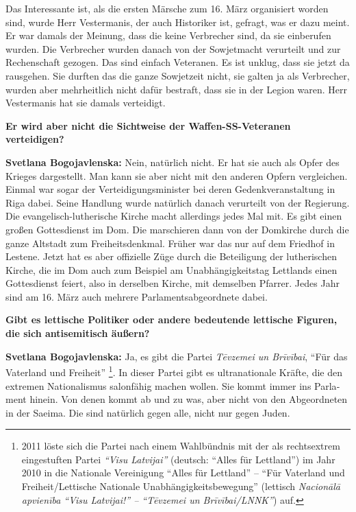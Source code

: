 \begin{otherlanguage}{ngerman}
Das Interessante ist, als die ersten Märsche zum 16. März organisiert worden sind, wurde Herr Vestermanis, der auch Historiker ist, gefragt, was er dazu meint. Er war damals der Meinung, dass die keine Verbrecher sind, da sie einberufen wurden. Die Verbrecher wurden danach von der Sowjetmacht verurteilt und zur Rechenschaft gezogen. Das sind einfach Veteranen. Es ist unklug, dass sie jetzt da rausgehen. Sie durften das die ganze Sowjetzeit nicht, sie galten ja als Verbrecher, wurden aber mehrheitlich nicht dafür bestraft, dass sie in der Legion waren. Herr Vestermanis hat sie damals verteidigt.

\textbf{Er wird aber nicht die Sichtweise der Waffen-SS-Veteranen verteidigen?}

\textbf{Svetlana Bogojavlenska:} Nein, natürlich nicht. Er hat sie auch als Opfer des Krieges dargestellt. Man kann sie aber nicht mit den anderen Opfern vergleichen. Einmal war sogar der Verteidigungsminister bei deren Gedenkveranstaltung in Riga dabei. Seine Handlung wurde natürlich danach verurteilt von der Regierung. Die evangelisch-lutherische Kirche macht allerdings jedes Mal mit. Es gibt einen großen Gottesdienst im Dom. Die marschieren dann von der Domkirche durch die ganze Altstadt zum Freiheitsdenkmal. Früher war das nur auf dem Friedhof in Lestene. Jetzt hat es aber offizielle Züge durch die Beteiligung der lutherischen Kirche, die im Dom auch zum Beispiel am Unabhängigkeitstag Lettlands einen Gottesdienst feiert, also in derselben Kirche, mit demselben Pfarrer. Jedes Jahr sind am 16. März auch mehrere Parlamentsabgeordnete dabei.

\textbf{Gibt es lettische Politiker oder andere bedeutende lettische Figuren, die sich antisemitisch äußern?}

\textbf{Svetlana Bogojavlenska:} Ja, es gibt die Partei \textit{Tēvzemei un Brīvībai}, "`Für das Vaterland und Freiheit"' \footnote{2011 löste sich die Partei nach einem Wahlbündnis mit der als rechtsextrem eingestuften Partei \textit{"`Visu Latvijai"'} (deutsch: "`Alles für Lettland"') im Jahr 2010 in die Nationale Vereinigung "`Alles für Lettland"' – "`Für Vaterland und Freiheit/Lettische Nationale Unabhängigkeitsbewegung"' (lettisch \textit{Nacionālā apvienība "`Visu Latvijai!"' – "`Tēvzemei un Brīvībai/LNNK"'}) auf.}. In dieser Partei gibt es ultranationale Kräfte, die den extremen Nationalismus salonfähig machen wollen. Sie kommt immer ins Parlament hinein. Von denen kommt ab und zu was, aber nicht von den Abgeordneten in der Saeima. Die sind natürlich gegen alle, nicht nur gegen Juden.


\end{otherlanguage}
